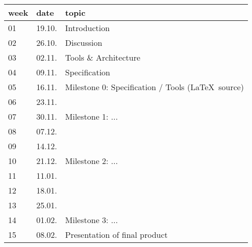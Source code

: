 \begin{tabular}{|l|l|l|}
\hline
week & date & topic 
\\\hline
01 & 19.10. & Introduction\\
02 & 26.10. & Discussion\\
03 & 02.11. & Tools \& Architecture\\
04 & 09.11. & Specification\\
05 & 16.11. & {Milestone 0}: Specification / Tools (\LaTeX\ source)\\
06 & 23.11. &\\
07 & 30.11. &  {Milestone 1:} ...\\
08 & 07.12. &\\
09 & 14.12. &\\
10 & 21.12. & Milestone 2: ...\\
11 & 11.01. &\\
12 & 18.01. &\\
13 & 25.01. &\\
14 & 01.02. & Milestone 3: ...\\
15 & 08.02. & Presentation of final product\\
\hline
\end{tabular}






\iffalse
Here the \important{official decision} concerning the \texttt{CLASSPATH}
etc. (same is in \texttt{Readme.devel}).

\begin{itemize}
\item the \importantxx{checked-in} versions of cup and lex are
  obligatory\footnote{They replace the ones previously used under
    \texttt{/home/java}, which had been the official ones so far. In
    effect, they are the same, and just checked in.}
\item the following \importantxx{classpath} is obligatory:
  \texttt{CLASSPATH=<WORKDIR>/Slime/src:<WORKDIR>/Slime/lib/JLex.jar:<WORKDIR>/Slime/lib/java_cup.jar:}
  where of course the \texttt{<WORKDIR>} is a placeholder and it has to be
  adapted by the individual user to his work directory.
\item no \importantxx{generated} files nor \importantxx{class} files will be
  checked in (unless technical reasons call for it, in which case we will
  discuss this in the light of the new arguments again)
\item no \importantxx{non-slime} code or data will be checked in under
  \texttt{CLASSPATH=<WORKDIR>/Slime/src}
\item revisions \emph{log}s are useful and worth reading, but it's not
  mandatory to read each other's logs.
\end{itemize}
\fi


